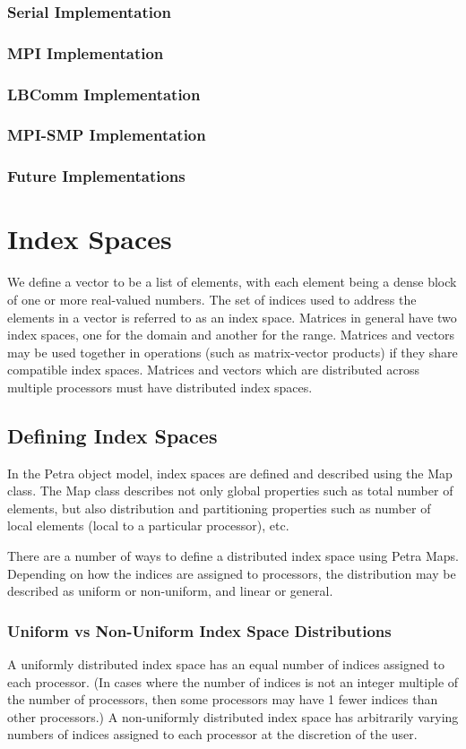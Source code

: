 \documentclass[12pt,relax]{PetraObjectModel}
\begin{document}
\subsubsection{Serial Implementation}
\subsubsection{MPI Implementation}
\subsubsection{LBComm Implementation}
\subsubsection{MPI-SMP Implementation}
\subsubsection{Future Implementations}


\section{Index Spaces}
We define a vector to be a list of elements, with each element being a
dense block of one or more real-valued numbers. The set of indices used to
address the elements in a vector is referred to as an index space. Matrices
in general have two index spaces, one for the domain and another for the
range. Matrices and vectors may be used together in operations (such as
matrix-vector products) if they share compatible index spaces. Matrices
and vectors which are distributed across multiple processors must have
distributed index spaces.

\subsection{Defining Index Spaces}
In the Petra object model, index spaces are defined and described using the
Map class. The Map class describes not only global properties such as total
number of elements, but also distribution and partitioning properties such as
number of local elements (local to a particular processor), etc.
 
There are a number of ways to define a distributed index space using Petra
Maps. Depending on how the indices are assigned to processors, the distribution
may be described as uniform or non-uniform, and linear or general.

\subsubsection{Uniform vs Non-Uniform Index Space Distributions}
A uniformly distributed index space has an equal number of indices assigned
to each processor. (In cases where the number of indices is not an integer
multiple of the number of processors, then some processors may have 1 fewer
indices than other processors.) A non-uniformly distributed index space has
arbitrarily varying numbers of indices assigned to each processor at
the discretion of the user.
\end{document}
